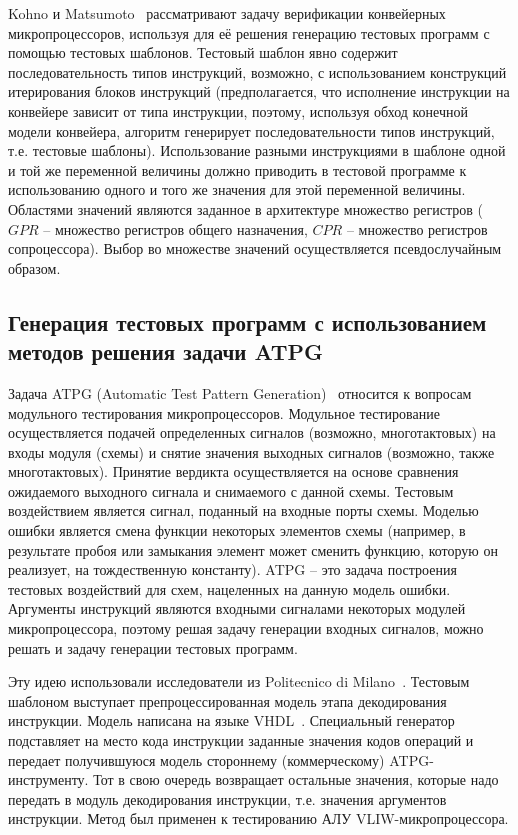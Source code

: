 Kohno и Matsumoto~\cite{mVpGen} рассматривают задачу верификации
конвейерных микропроцессоров, используя для её решения генерацию
тестовых программ с помощью тестовых шаблонов. Тестовый шаблон явно
содержит последовательность типов инструкций, возможно, с
использованием конструкций итерирования блоков инструкций
(предполагается, что исполнение инструкции на конвейере зависит от
типа инструкции, поэтому, используя обход конечной модели конвейера,
алгоритм генерирует последовательности типов инструкций, т.е.
тестовые шаблоны). Использование разными инструкциями в шаблоне
одной и той же переменной величины должно приводить в тестовой
программе к использованию одного и того же значения для этой
переменной величины. Областями значений являются заданное в
архитектуре множество регистров ($GPR$ -- множество регистров общего
назначения, $CPR$ -- множество регистров сопроцессора). Выбор во
множестве значений осуществляется псевдослучайным образом.


\subsection{Генерация тестовых программ с использованием методов
решения задачи ATPG}

Задача ATPG (Automatic Test Pattern Generation)~\cite{ATPGbook}
относится к вопросам модульного тестирования микропроцессоров.
Модульное тестирование осуществляется подачей определенных сигналов
(возможно, многотактовых) на входы модуля (схемы) и снятие значения
выходных сигналов (возможно, также многотактовых). Принятие вердикта
осуществляется на основе сравнения ожидаемого выходного сигнала и
снимаемого с данной схемы. Тестовым воздействием является сигнал,
поданный на входные порты схемы. Моделью ошибки является смена
функции некоторых элементов схемы (например, в результате пробоя или
замыкания элемент может сменить функцию, которую он реализует, на
тождественную константу). ATPG -- это задача построения тестовых
воздействий для схем, нацеленных на данную модель ошибки. Аргументы
инструкций являются входными сигналами некоторых модулей
микропроцессора, поэтому решая задачу генерации входных сигналов,
можно решать и задачу генерации тестовых программ.

Эту идею использовали исследователи из Politecnico di
Milano~\cite{toATPG}. Тестовым шаблоном выступает
препроцессированная модель этапа декодирования инструкции. Модель
написана на языке VHDL~\cite{VHDL}. Специальный генератор
подставляет на место кода инструкции заданные значения кодов
операций и передает получившуюся модель стороннему (коммерческому)
ATPG-инструменту. Тот в свою очередь возвращает остальные значения,
которые надо передать в модуль декодирования инструкции, т.е.
значения аргументов инструкции. Метод был применен к тестированию
АЛУ VLIW-микропроцессора.


